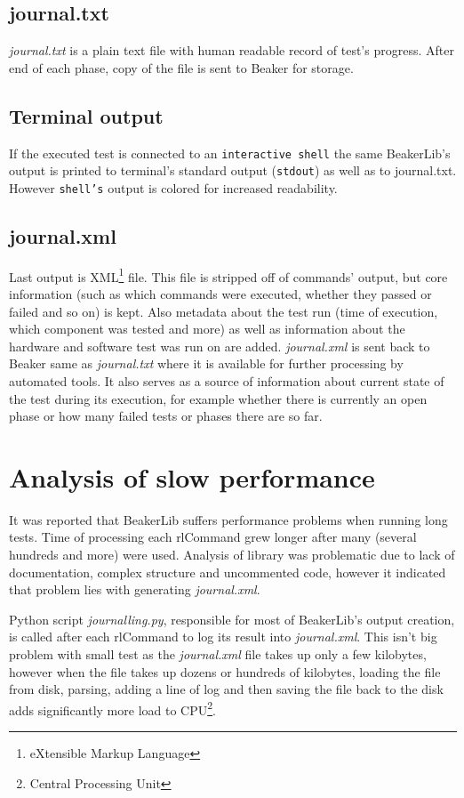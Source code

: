 \subsection{journal.txt}
\textit{journal.txt} is a plain text file with human readable record of test's progress. After end of each phase, copy of the file is sent to Beaker for storage.

\subsection{Terminal output}
If the executed test is connected to an \texttt{interactive shell} the same BeakerLib's output is printed to terminal's standard output (\texttt{stdout}) as well as to journal.txt. However \texttt{shell's} output is colored for increased readability.  

\subsection{journal.xml}
Last output is XML\footnote{eXtensible Markup Language} file. This file is stripped off of commands' output, but core information (such as which commands were executed, whether they passed or failed and so on) is kept. Also metadata about the test run (time of execution, which component was tested and more) as well as information about the hardware and software test was run on are added. \textit{journal.xml} is sent back to Beaker same as \textit{journal.txt} where it is available for further processing by automated tools. It also serves as a source of information about current state of the test during its execution, for example whether there is currently an open phase or how many failed tests or phases there are so far.


\section{Analysis of slow performance}
It was reported that BeakerLib suffers performance problems when running long tests. Time of processing each rlCommand grew longer after many (several hundreds and more) were used. Analysis of library was problematic due to lack of documentation, complex structure and uncommented code, however it indicated that problem lies with generating \textit{journal.xml}. 

Python script \textit{journalling.py}, responsible for most of BeakerLib's output creation, is called after each rlCommand to log its result into \textit{journal.xml}. This isn't big problem with small test as the \textit{journal.xml} file takes up only a few kilobytes, however when the file takes up dozens or hundreds of kilobytes, loading the file from disk, parsing, adding a line of log and then saving the file back to the disk adds significantly more load to CPU\footnote{Central Processing Unit}. 


